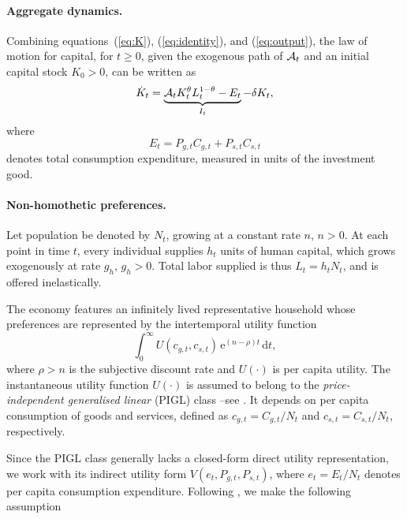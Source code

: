 \documentclass[12pt,a4paper]{article}
\begin{document}
\paragraph{Aggregate dynamics.}

Combining equations~(\ref{eq:K}), (\ref{eq:identity}), and (\ref{eq:output}), the law of motion for capital, for \( t \geq 0 \), given the exogenous path of \( {\cal A}_t \) and an initial capital stock \( K_0 > 0 \), can be written as
\[
\dot{K}_t = \underbrace{{\cal A}_t K_t^{\theta} L_t^{1 - \theta} - E_t}_{I_t} - \delta K_t,
\]
where
\begin{equation}\label{eq:E}
E_t = P_{g,t} C_{g,t} + P_{s,t} C_{s,t}
\end{equation}
denotes total consumption expenditure, measured in units of the investment good.


\paragraph{Non-homothetic preferences.}

Let population be denoted by \( N_t \), growing at a constant rate \( n  \), \( n > 0 \). At each point in time \( t \), every individual supplies \( h_t \) units of human capital, which grows exogenously at rate  \( g_h \), \( g_h > 0 \). Total labor supplied is thus \( L_t = h_t N_t \), and is offered inelastically.

The economy features an infinitely lived representative household whose preferences are represented by the intertemporal utility function
\begin{equation}\label{eq:pref}
 \int_{0}^{\infty} U(c_{g,t}, c_{s,t}) \, \text{e}^{(n - \rho) t} \, \text{d}t,
\end{equation}
where \( \rho > n \) is the subjective discount rate and  \( U(\cdot) \) is per capita utility. The instantaneous utility function \( U(\cdot) \) is assumed to belong to the {\it price-independent generalised linear} (PIGL) class --see \cite{Boppart_2014}. It depends on per capita consumption of goods and services, defined as \( c_{g,t} = C_{g,t}/N_t \) and \( c_{s,t} = C_{s,t}/N_t \), respectively.

Since the PIGL class generally lacks a closed-form direct utility representation, we work with its indirect utility form \( V(e_t, P_{g,t}, P_{s,t}) \), where \( e_t = E_t / N_t \) denotes per capita consumption expenditure. Following \cite{Boppart_2014}, we make the following assumption
\end{document}
